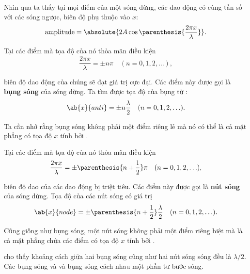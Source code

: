 Nhìn qua  ta thấy tại mọi điểm của một sóng dừng, các dao động có cùng tần số với các sóng ngược, biên độ phụ thuộc vào $x$:
\begin{equation*}
	\text{amplitude} = \absolute{2 A \cos\parenthesis{\frac{2\pi x}{\lambda}}}.
\end{equation*}

\noindent
Tại các điểm mà tọa độ của nó thỏa mãn điều kiện
\begin{equation}\label{eq:14_55}
	\frac{2\pi x}{\lambda} = \pm n \pi\quad (n = 0, 1, 2, \ldots),
\end{equation}

\noindent
biên độ dao động của chúng sẽ đạt giá trị cực đại. Các điểm này được gọi là \textbf{bụng sóng} của sóng dừng. Ta tìm được tọa độ của bụng từ :
\begin{equation}\label{eq:14_56}
	\ab{x}{anti} = \pm n \frac{\lambda}{2}\quad (n = 0, 1, 2, \ldots).
\end{equation}

Ta cần nhớ rằng bụng sóng không phải một điểm riêng lẻ mà nó có thể là cả mặt phẳng có tọa độ $x$ tính bởi .

Tại các điểm mà tọa độ của nó thỏa mãn điều kiện
\begin{equation*}
	\frac{2\pi x}{\lambda} = \pm \parenthesis{n + \frac{1}{2}} \pi \quad (n = 0, 1, 2, \ldots),
\end{equation*}

\noindent
biên độ dao của các dao động bị triệt tiêu. Các điểm này được gọi là \textbf{nút sóng} của sóng dừng. Tọa độ của các nút sóng có giá trị
\begin{equation}\label{eq:14_57}
	\ab{x}{node} = \pm \parenthesis{n + \frac{1}{2}} \frac{\lambda}{2} \quad (n = 0, 1, 2, \ldots).
\end{equation}

\noindent
Cũng giống như bụng sóng, một nút sóng không phải một điểm riêng biệt mà là cả mặt phẳng chứa các điểm có tọa độ $x$ tính bởi .

 cho thấy khoảng cách giữa hai bụng sóng cũng như hai nút sóng sóng đều là $\lambda/2$. Các bụng sóng và và bụng sóng cách nhau một phần tư bước sóng.

